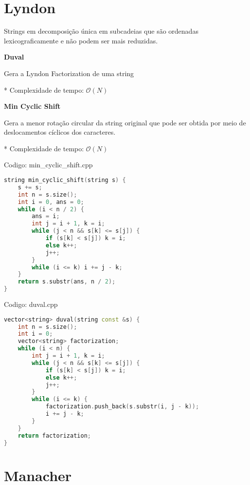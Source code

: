 \documentclass[10pt, a4paper, oneside]{book}
\begin{document}
\section{Lyndon}


Strings em decomposição única em subcadeias que são ordenadas lexicograficamente e não podem ser mais reduzidas.



\textbf{Duval} 



Gera a Lyndon Factorization de uma string



* Complexidade de tempo: $\mathcal{O}(N)$



\textbf{Min Cyclic Shift} 



Gera a menor rotação circular da string original que pode ser obtida por meio de deslocamentos cíclicos dos caracteres.



* Complexidade de tempo: $\mathcal{O}(N)$
\hfill

Codigo: min\_cyclic\_shift.cpp

\begin{lstlisting}[language=C++]
string min_cyclic_shift(string s) {
    s += s;
    int n = s.size();
    int i = 0, ans = 0;
    while (i < n / 2) {
        ans = i;
        int j = i + 1, k = i;
        while (j < n && s[k] <= s[j]) {
            if (s[k] < s[j]) k = i;
            else k++;
            j++;
        }
        while (i <= k) i += j - k;
    }
    return s.substr(ans, n / 2);
}
\end{lstlisting}
\hfill

Codigo: duval.cpp

\begin{lstlisting}[language=C++]
vector<string> duval(string const &s) {
    int n = s.size();
    int i = 0;
    vector<string> factorization;
    while (i < n) {
        int j = i + 1, k = i;
        while (j < n && s[k] <= s[j]) {
            if (s[k] < s[j]) k = i;
            else k++;
            j++;
        }
        while (i <= k) {
            factorization.push_back(s.substr(i, j - k));
            i += j - k;
        }
    }
    return factorization;
}
\end{lstlisting}
\hfill

\section{Manacher}
\end{document}

